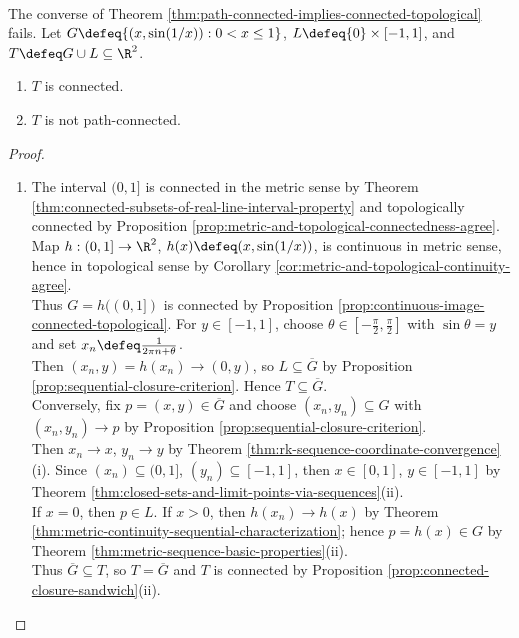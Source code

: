 \begin{counterexample} \label{cex:topologist-sine-curve-connected-not-path-connected} \\
The converse of Theorem \ref{thm:path-connected-implies-connected-topological} fails. Let $G\defeq\{(x,\sin(1/x)):0<x\leq1\}$, $L\defeq\{0\}\times[-1,1]$, and $T\defeq G\cup L\subseteq\R^2$.
\begin{enumerate}[label=(\roman*)]
\setlength{\itemsep}{0pt}
\item $T$ is connected.
\item $T$ is not path-connected.
\end{enumerate}
\begin{proof}
\begin{enumerate}[label=(\roman*)]
\setlength{\itemsep}{0pt}
\item The interval $(0,1]$ is connected in the metric sense by Theorem \ref{thm:connected-subsets-of-real-line-interval-property} and topologically connected by Proposition \ref{prop:metric-and-topological-connectedness-agree}.\\
Map $h:(0,1]\to\R^2$, $h(x)\defeq(x,\sin(1/x))$, is continuous in metric sense, hence in topological sense by Corollary \ref{cor:metric-and-topological-continuity-agree}.\\
Thus $G=h((0,1])$ is connected by Proposition \ref{prop:continuous-image-connected-topological}. For $y\in[-1,1]$, choose $\theta\in[-\frac{\pi}{2},\frac{\pi}{2}]$ with $\sin\theta=y$ and set $x_n\defeq\frac{1}{2\pi n+\theta}$.\\
Then $(x_n,y)=h(x_n)\to(0,y)$, so $L\subseteq\overline{G}$ by Proposition \ref{prop:sequential-closure-criterion}. Hence $T\subseteq\overline{G}$.\\
Conversely, fix $p=(x,y)\in\overline{G}$ and choose $(x_n,y_n)\subseteq G$ with $(x_n,y_n)\to p$ by Proposition \ref{prop:sequential-closure-criterion}.\\
Then $x_n\to x$, $y_n\to y$ by Theorem \ref{thm:rk-sequence-coordinate-convergence}(i). Since $(x_n)\subseteq(0,1]$, $(y_n)\subseteq[-1,1]$, then $x\in[0,1]$, $y\in[-1,1]$ by Theorem \ref{thm:closed-sets-and-limit-points-via-sequences}(ii).\\
If $x=0$, then $p\in L$. If $x>0$, then $h(x_n)\to h(x)$ by Theorem \ref{thm:metric-continuity-sequential-characterization}; hence $p=h(x)\in G$ by Theorem \ref{thm:metric-sequence-basic-properties}(ii).\\
Thus $\overline{G}\subseteq T$, so $T=\overline{G}$ and $T$ is connected by Proposition \ref{prop:connected-closure-sandwich}(ii).

\end{enumerate}
\end{proof}
\end{counterexample}
